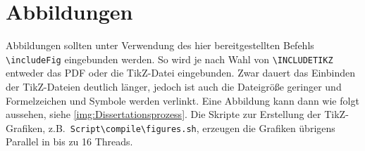 \section{Abbildungen}
\label{sec:abbildungen}

Abbildungen sollten unter Verwendung des hier bereitgestellten Befehls \texttt{\textbackslash includeFig} eingebunden werden. So wird je nach Wahl von \texttt{\textbackslash INCLUDETIKZ} entweder das PDF oder die TikZ-Datei eingebunden. Zwar dauert das Einbinden der TikZ-Dateien deutlich länger, jedoch ist auch die Dateigröße geringer und Formelzeichen und Symbole werden verlinkt. Eine Abbildung kann dann wie folgt aussehen, siehe \cref{img:Dissertationsprozess}. Die Skripte zur Erstellung der TikZ-Grafiken, z.B.\ \texttt{Script\textbackslash{}compile\textbackslash{}figures.sh}, erzeugen die Grafiken übrigens Parallel in bis zu 16 Threads.

